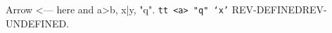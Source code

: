 \documentclass{article}
\begin{document}
Arrow <--- here and a>b, x|y, "q". \texttt{tt <a> "q" `x'}
\ifdefined\XeTeXrevision REV-DEFINED\else REV-UNDEFINED\fi.
\end{document}
